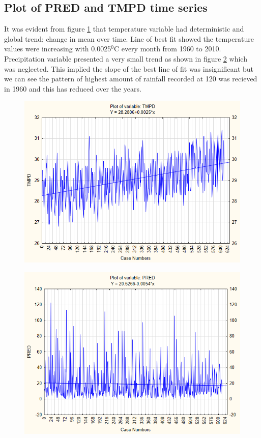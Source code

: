 \documentclass[12pt,a4paper]{article}
\begin{document}
\subsection{Plot of PRED and TMPD time series}
It was evident from figure \ref{fig:trended-tmpd} that temperature variable had deterministic and global trend; change in mean over time. Line of best fit showed the temperature values were increasing with 0.0025$^0$C every month from 1960 to 2010. Precipitation variable presented a very small trend as shown in figure \ref{fig:timeseries-pred} which was neglected. This implied the slope of the best line of fit was insignificant but we can see the pattern of highest amount of rainfall recorded at 120 was recieved in 1960 and this has reduced over the years.
\newpage
\begin{figure}[h]
	\centering
	\includegraphics[width=0.7\linewidth, height=0.3\textheight]{"../Assignment 2/Trended TMPD"}
	\caption{}
	\label{fig:trended-tmpd}
\end{figure}

\begin{figure}[h]
	\centering
	\includegraphics[width=0.7\linewidth, height=0.3\textheight ]{"../Assignment 2/TimeSeries PRED"}
	\caption{}
	\label{fig:timeseries-pred}
\end{figure}
\newpage
\end{document}
